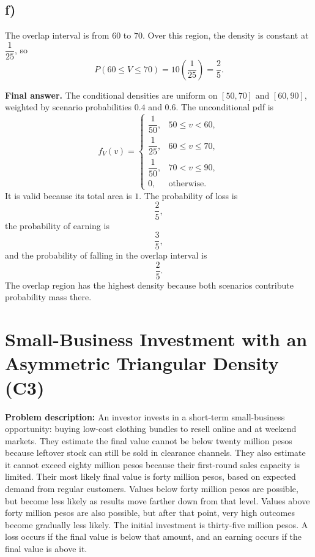 \subsection*{f)}
The overlap interval is from $60$ to $70$. Over this region, the density is constant at $\dfrac{1}{25}$, so
\[
P(60\le V\le 70)=10\left(\frac{1}{25}\right)=\frac{2}{5}.
\]

\textbf{Final answer.}
The conditional densities are uniform on $[50,70]$ and $[60,90]$, weighted by scenario probabilities $0.4$ and $0.6$. The unconditional pdf is
\[
f_V(v)=
\begin{cases}
	\dfrac{1}{50}, & 50\le v<60,\\[6pt]
	\dfrac{1}{25}, & 60\le v\le 70,\\[6pt]
	\dfrac{1}{50}, & 70<v\le 90,\\[6pt]
	0, & \text{otherwise.}
\end{cases}
\]
It is valid because its total area is $1$. The probability of loss is
\[
\frac{2}{5},
\]
the probability of earning is
\[
\frac{3}{5},
\]
and the probability of falling in the overlap interval is
\[
\frac{2}{5}.
\]
The overlap region has the highest density because both scenarios contribute probability mass there.

\section{Small-Business Investment with an Asymmetric Triangular Density (C3)}

\textbf{Problem description:}
An investor invests in a short-term small-business opportunity: buying low-cost clothing bundles to resell online and at weekend markets. They estimate the final value cannot be below twenty million pesos because leftover stock can still be sold in clearance channels. They also estimate it cannot exceed eighty million pesos because their first-round sales capacity is limited. Their most likely final value is forty million pesos, based on expected demand from regular customers. Values below forty million pesos are possible, but become less likely as results move farther down from that level. Values above forty million pesos are also possible, but after that point, very high outcomes become gradually less likely. The initial investment is thirty-five million pesos. A loss occurs if the final value is below that amount, and an earning occurs if the final value is above it.

